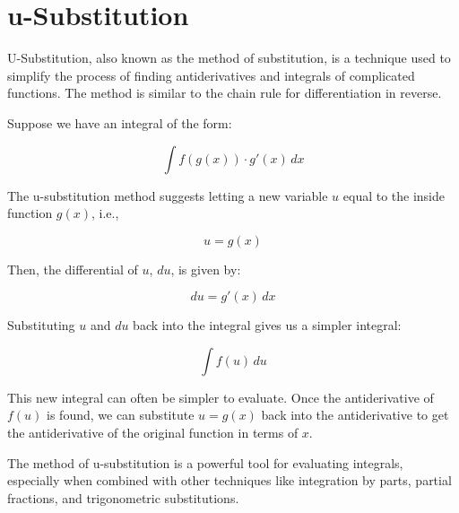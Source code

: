 \chapter{u-Substitution}


U-Substitution, also known as the method of substitution, is a technique used to simplify the process of finding antiderivatives and integrals of complicated functions. The method is similar to the chain rule for differentiation in reverse.

Suppose we have an integral of the form:

\begin{equation}
\int f(g(x)) \cdot g'(x) \, dx
\end{equation}

The u-substitution method suggests letting a new variable $u$ equal to the inside function $g(x)$, i.e., 

\begin{equation}
u = g(x)
\end{equation}

Then, the differential of $u$, $du$, is given by:

\begin{equation}
du = g'(x) \, dx
\end{equation}

Substituting $u$ and $du$ back into the integral gives us a simpler integral:

\begin{equation}
\int f(u) \, du
\end{equation}

This new integral can often be simpler to evaluate. Once the antiderivative of $f(u)$ is found, we can substitute $u=g(x)$ back into the antiderivative to get the antiderivative of the original function in terms of $x$.

The method of u-substitution is a powerful tool for evaluating integrals, especially when combined with other techniques like integration by parts, partial fractions, and trigonometric substitutions.
